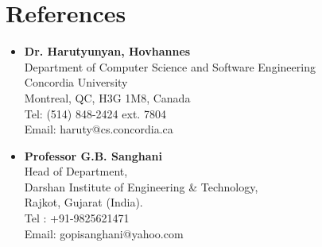 \documentclass[11pt,a4paper,sans]{moderncv} %
\begin{document}

\section{References}
\begin{itemize}
\item \textbf{Dr. Harutyunyan, Hovhannes}\\
Department of Computer Science and Software Engineering\\
Concordia University\\
Montreal, QC, H3G 1M8, Canada\\
Tel: (514) 848-2424 ext. 7804\\
Email: haruty@cs.concordia.ca\\
\item \textbf{Professor G.B. Sanghani}\\
Head of Department,\\
Darshan Institute of Engineering \& Technology,\\
Rajkot, Gujarat (India).\\
Tel : +91-9825621471\\
Email: gopisanghani@yahoo.com
\end{itemize}
\end{document}
